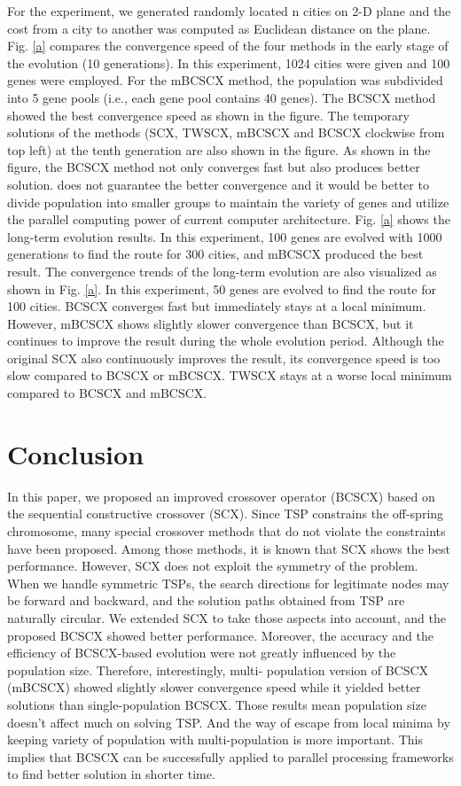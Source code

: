 For the experiment, we generated randomly located n cities on 2-D plane and the cost from a city to another was computed as Euclidean distance on the plane. Fig. \ref{a} compares the convergence speed of the four methods in the early stage of the evolution (10 generations). In this experiment, 1024 cities were given and 100 genes were employed. For the mBCSCX method, the population was subdivided into 5 gene pools (i.e., each gene pool contains 40 genes). The BCSCX method showed the best convergence speed as shown in the figure. The temporary solutions of the methods (SCX, TWSCX, mBCSCX and BCSCX clockwise from top left) at the tenth generation are also shown in the figure. As shown in the figure, the BCSCX method not only converges fast but also produces better solution. does not guarantee the better convergence and it would be better to divide population into smaller groups to maintain the variety of genes and utilize the parallel computing power of current computer architecture.
Fig. \ref{a} shows the long-term evolution results. In this experiment, 100 genes are evolved with 1000 generations to find the route for 300 cities, and mBCSCX produced the best result.
The convergence trends of the long-term evolution are also visualized as shown in Fig. \ref{a}. In this experiment, 50 genes are evolved to find the route for 100 cities. BCSCX converges fast but immediately stays at a local minimum. However, mBCSCX shows slightly slower convergence than BCSCX, but it continues to improve the result during the whole evolution period. Although the original SCX also continuously improves the result, its convergence speed is too slow compared to BCSCX or mBCSCX. TWSCX stays at a worse local minimum compared to BCSCX and mBCSCX.


\section{Conclusion}


In this paper, we proposed an improved crossover operator (BCSCX) based on the sequential constructive crossover (SCX). Since TSP constrains the off-spring chromosome, many special crossover methods that do not violate the constraints have been proposed. Among those methods, it is known that SCX shows the best performance.
However, SCX does not exploit the symmetry of the problem. When we handle symmetric TSPs, the search directions for legitimate nodes may be forward and backward, and the solution paths obtained from TSP are naturally circular. We extended SCX to take those aspects into account, and the proposed BCSCX showed better performance.
Moreover, the accuracy and the efficiency of BCSCX-based evolution were not greatly influenced by the population size. Therefore, interestingly, multi- population version of BCSCX (mBCSCX) showed slightly slower convergence speed while it yielded better solutions than single-population BCSCX.
Those results mean population size doesn't affect much on solving TSP. And the way of escape from local minima by keeping variety of population with multi-population is more important. This implies that BCSCX can be successfully applied to parallel processing frameworks to find better solution in shorter time.

